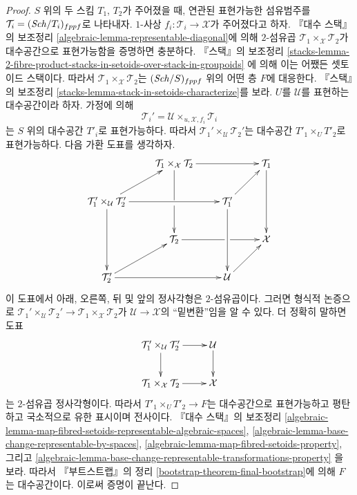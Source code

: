 \begin{proof}
$S$ 위의 두 스킴 $T_1$, $T_2$가 주어졌을 때, 연관된 표현가능한
섬유범주를 $\mathcal{T}_i = (\mathit{Sch}/T_i)_{fppf}$로 나타내자.
$1$-사상 $f_i : \mathcal{T}_i \to \mathcal{X}$가 주어졌다고 하자.
『대수 스택』의 보조정리
\ref{algebraic-lemma-representable-diagonal}에 의해 $2$-섬유곱
$\mathcal{T}_1 \times_\mathcal{X} \mathcal{T}_2$가 대수공간으로
표현가능함을 증명하면 충분하다. 『스택』의 보조정리
\ref{stacks-lemma-2-fibre-product-stacks-in-setoids-over-stack-in-groupoids}
에 의해 이는 어쨌든 셋토이드 스택이다. 따라서
$\mathcal{T}_1 \times_\mathcal{X} \mathcal{T}_2$는
$(\mathit{Sch}/S)_{fppf}$ 위의 어떤 층 $F$에 대응한다. 『스택』의 보조정리
\ref{stacks-lemma-stack-in-setoids-characterize}를 보라.
$U$를 $\mathcal{U}$를 표현하는 대수공간이라 하자. 가정에 의해
$$
\mathcal{T}_i' = \mathcal{U} \times_{u, \mathcal{X}, f_i} \mathcal{T}_i
$$
는 $S$ 위의 대수공간 $T'_i$로 표현가능하다. 따라서
$\mathcal{T}_1' \times_\mathcal{U} \mathcal{T}_2'$는 대수공간
$T'_1 \times_U T'_2$로 표현가능하다. 다음 가환 도표를 생각하자.
$$
\xymatrix{
&
\mathcal{T}_1 \times_{\mathcal X} \mathcal{T}_2 \ar[rr]\ar'[d][dd] & &
\mathcal{T}_1 \ar[dd] \\
\mathcal{T}_1' \times_\mathcal{U} \mathcal{T}_2' \ar[ur]\ar[rr]\ar[dd] & &
\mathcal{T}_1' \ar[ur]\ar[dd] \\
&
\mathcal{T}_2 \ar'[r][rr] & &
\mathcal X \\
\mathcal{T}_2' \ar[rr]\ar[ur] & &
\mathcal{U} \ar[ur] }
$$
이 도표에서 아래, 오른쪽, 뒤 및 앞의 정사각형은 $2$-섬유곱이다.
그러면 형식적 논증으로
$\mathcal{T}_1' \times_\mathcal{U} \mathcal{T}_2' \to
\mathcal{T}_1 \times_{\mathcal X} \mathcal{T}_2$가
$\mathcal{U} \to \mathcal{X}$의 “밑변환”임을 알 수 있다.
더 정확히 말하면 도표
$$
\xymatrix{
\mathcal{T}_1' \times_\mathcal{U} \mathcal{T}_2' \ar[d] \ar[r] &
\mathcal{U} \ar[d] \\
\mathcal{T}_1 \times_{\mathcal X} \mathcal{T}_2 \ar[r] &
\mathcal{X}
}
$$
는 $2$-섬유곱 정사각형이다.
따라서 $T'_1 \times_U T'_2 \to F$는 대수공간으로 표현가능하고
평탄하고 국소적으로 유한 표시이며 전사이다. 『대수 스택』의 보조정리
\ref{algebraic-lemma-map-fibred-setoids-representable-algebraic-spaces},
\ref{algebraic-lemma-base-change-representable-by-spaces},
\ref{algebraic-lemma-map-fibred-setoids-property}, 그리고
\ref{algebraic-lemma-base-change-representable-transformations-property}
을 보라. 따라서 『부트스트랩』의 정리
\ref{bootstrap-theorem-final-bootstrap}에 의해 $F$는 대수공간이다.
이로써 증명이 끝난다.
\end{proof}

